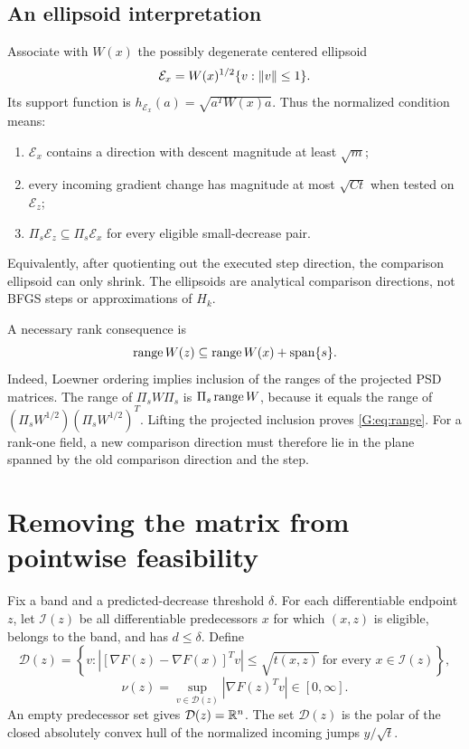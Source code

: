 \subsection{An ellipsoid interpretation}
Associate with $W(x)$ the possibly degenerate centered ellipsoid
\[
 \mathcal E_x=W(x)^{1/2}\{v:\left\|v\right\|\le1\}.
\]
Its support function is $h_{\mathcal E_x}(a)=\sqrt{a^TW(x)a}$. Thus the normalized condition means:
\begin{enumerate}[label=(\roman*),itemsep=3pt]
\item $\mathcal E_x$ contains a direction with descent magnitude at least $\sqrt m$;
\item every incoming gradient change has magnitude at most $\sqrt{Ct}$ when tested on $\mathcal E_z$;
\item $\Pi_s\mathcal E_z\subseteq\Pi_s\mathcal E_x$ for every eligible small-decrease pair.
\end{enumerate}
Equivalently, after quotienting out the executed step direction, the comparison ellipsoid can only shrink. The ellipsoids are analytical comparison directions, not BFGS steps or approximations of $H_k$.

A necessary rank consequence is
\begin{equation}
 \operatorname{range} W(z)\subseteq\operatorname{range} W(x)+\operatorname{span}\{s\}. \label{G:eq:range}
\end{equation}
Indeed, Loewner ordering implies inclusion of the ranges of the projected PSD matrices. The range of $\Pi_sW\Pi_s$ is $\Pi_s\operatorname{range} W$, because it equals the range of $(\Pi_sW^{1/2})(\Pi_sW^{1/2})^T$. Lifting the projected inclusion proves \eqref{G:eq:range}. For a rank-one field, a new comparison direction must therefore lie in the plane spanned by the old comparison direction and the step.


\setcounter{section}{2}
\setcounter{theorem}{0}
\setcounter{equation}{3}


\section{Removing the matrix from pointwise feasibility}

Fix a band and a predicted-decrease threshold $\delta$. For each differentiable endpoint $z$, let $\mathcal I(z)$ be all differentiable predecessors $x$ for which $(x,z)$ is eligible, belongs to the band, and has $d\le\delta$. Define
\[
 \mathcal D(z)=\left\{v:\left|[\nabla F(z)-\nabla F(x)]^Tv\right|
       \le\sqrt{t(x,z)}\ \text{for every }x\in\mathcal I(z)\right\},
\]
\begin{equation}
 \nu(z)=\sup_{v\in\mathcal D(z)}|\nabla F(z)^Tv|\in[0,\infty]. \label{G:eq:nu}
\end{equation}
An empty predecessor set gives $\mathcal D(z)=\mathbb R^n$. The set $\mathcal D(z)$ is the polar of the closed absolutely convex hull of the normalized incoming jumps $y/\sqrt t$.

